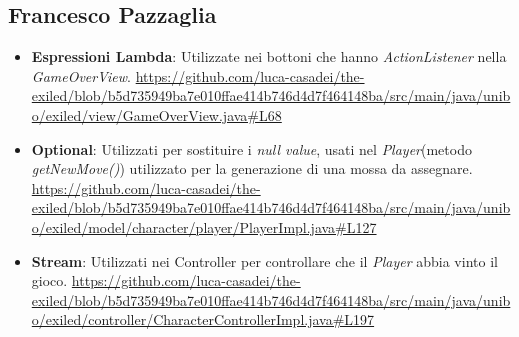 \documentclass[a4paper,12pt]{report}
\begin{document}
\subsection{Francesco Pazzaglia}

\begin{itemize}
	\item \textbf{Espressioni Lambda}: Utilizzate nei bottoni che hanno \textit{ActionListener} nella \textit{GameOverView}.
	\url{https://github.com/luca-casadei/the-exiled/blob/b5d735949ba7e010ffae414b746d4d7f464148ba/src/main/java/unibo/exiled/view/GameOverView.java#L68}
	\item \textbf{Optional}: Utilizzati per sostituire i \textit{null value}, usati nel \textit{Player}(metodo \textit{getNewMove()}) utilizzato per la generazione di una mossa da assegnare.
	\url{https://github.com/luca-casadei/the-exiled/blob/b5d735949ba7e010ffae414b746d4d7f464148ba/src/main/java/unibo/exiled/model/character/player/PlayerImpl.java#L127}
	\item \textbf{Stream}: Utilizzati nei Controller per controllare che il \textit{Player} abbia vinto il gioco.
	\url{https://github.com/luca-casadei/the-exiled/blob/b5d735949ba7e010ffae414b746d4d7f464148ba/src/main/java/unibo/exiled/controller/CharacterControllerImpl.java#L197}
\end{itemize}
\end{document}
